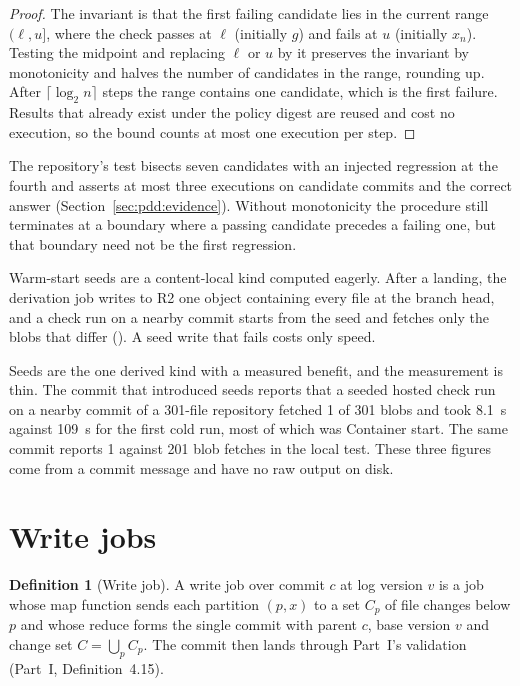 \documentclass[11pt,letterpaper]{article}
\theoremstyle{definition}
\newtheorem{definition}[theorem]{Definition}
\theoremstyle{remark}
\begin{document}
\begin{proof}
The invariant is that the first failing candidate lies in the current range $(\ell,u]$, where the check passes at $\ell$ (initially $g$) and fails at $u$ (initially $x_n$). Testing the midpoint and replacing $\ell$ or $u$ by it preserves the invariant by monotonicity and halves the number of candidates in the range, rounding up. After $\lceil\log_2 n\rceil$ steps the range contains one candidate, which is the first failure. Results that already exist under the policy digest are reused and cost no execution, so the bound counts at most one execution per step.
\end{proof}

The repository's test bisects seven candidates with an injected regression at the fourth and asserts at most three executions on candidate commits and the correct answer (Section~\ref{sec:pdd:evidence}). Without monotonicity the procedure still terminates at a boundary where a passing candidate precedes a failing one, but that boundary need not be the first regression.

Warm-start seeds are a content-local kind computed eagerly. After a landing, the derivation job writes to R2 one object containing every file at the branch head, and a check run on a nearby commit starts from the seed and fetches only the blobs that differ (). A seed write that fails costs only speed.

Seeds are the one derived kind with a measured benefit, and the measurement is thin. The commit that introduced seeds reports that a seeded hosted check run on a nearby commit of a 301-file repository fetched 1 of 301 blobs %
and took 8.1~s against 109~s for the first cold run, most of which was Container start. %
The same commit reports 1 against 201 blob fetches in the local test. %
These three figures come from a commit message and have no raw output on disk.

\section{Write jobs}
\label{sec:pdd:write}

\begin{definition}[Write job]
\label{def:pdd:writejob}
A write job over commit $c$ at log version $v$ is a job whose map function sends each partition $(p,x)$ to a set $C_p$ of file changes below $p$ and whose reduce forms the single commit with parent $c$, base version $v$ and change set $C=\bigcup_p C_p$. The commit then lands through Part~I's validation (Part~I, Definition~4.15).
\end{definition}
\end{document}
